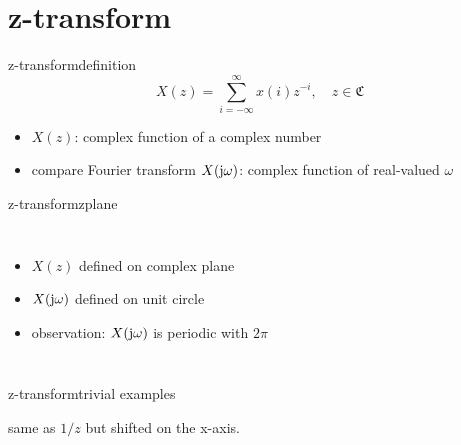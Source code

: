 \section{z-transform}
	\begin{frame}{z-transform}{definition}
        \begin{equation*}
            X(z) = \sum\limits_{i=-\infty}^{\infty}{x(i)z^{-i}},\quad z\in \mathfrak{C}
        \end{equation*}
        \begin{itemize}
            \item<2->   $X(z)$: complex function of a complex number
            \bigskip
            \item<3->   compare Fourier transform $X(\mathrm{j}\omega)$: complex function of real-valued $\omega$
        \end{itemize}
	\end{frame}
	\begin{frame}{z-transform}{zplane}
        \vspace{-5mm}
        \begin{columns}
                \begin{itemize}
                    \item $X(z)$ defined on complex plane
                    \item   $X(\mathrm{j}\omega)$ defined on unit circle
                    \bigskip 
                    \item<3-> observation: $X(\mathrm{j}\omega)$ is periodic with $2\pi$
                \end{itemize}
        \end{columns}
	\end{frame}
	\begin{frame}{z-transform}{trivial examples}
        
        
        same as $1/z$ but shifted on the x-axis.
        
	\end{frame}
